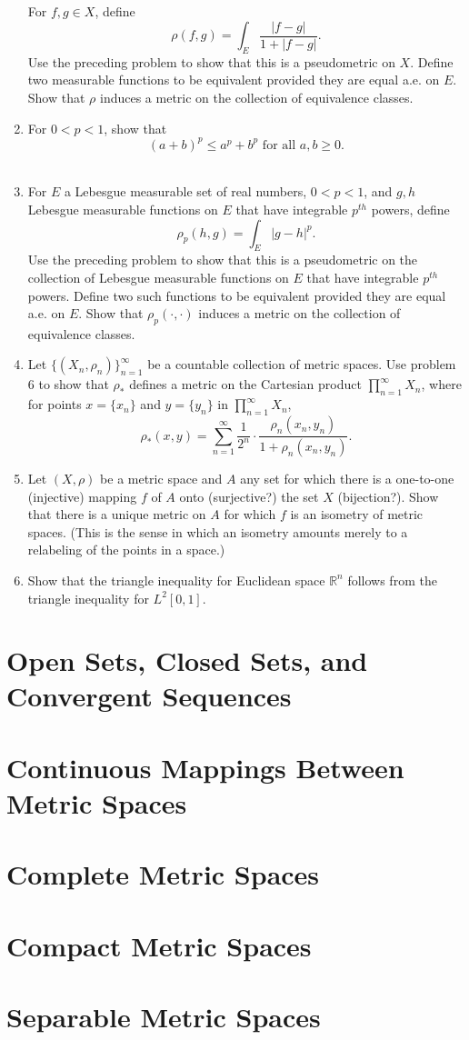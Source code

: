 \begin{enumerate}
    For $f,g\in X$, define
    \[
    \rho(f,g)=\int_E\frac{|f-g|}{1+|f-g|}.    
    \]
    Use the preceding problem to show that this is a pseudometric on $X$. 
    Define two measurable functions to be equivalent provided they are equal a.e. on $E$.
    Show that $\rho$ induces a metric on the collection of equivalence classes.
    \item For $0<p<1$, show that 
    \[
    (a+b)^p\le a^p+b^p\text{ for all }a,b\ge0.    
    \]\
    \item For $E$ a Lebesgue measurable set of real numbers, $0<p<1$, and $g,h$ Lebesgue measurable functions on $E$ that have integrable $p^{th}$ powers, define
    \[
    \rho_p(h,g)=\int_E|g-h|^p.    
    \]  
    Use the preceding problem to show that this is a pseudometric on the collection of Lebesgue measurable functions on $E$ that have integrable $p^{th}$ powers.
    Define two such functions to be equivalent provided they are equal a.e. on $E$. 
    Show that $\rho_p(\cdot,\cdot)$ induces a metric on the collection of equivalence classes.
    \item Let $\{(X_n,\rho_n)\}_{n=1}^\infty$ be a countable collection of metric spaces.
    Use problem 6 to show that $\rho_*$ defines a metric on the Cartesian product $\prod_{n=1}^\infty X_n$, where for points $x = \{x_n\}$ and $y= \{y_n\}$ in $\prod_{n=1}^\infty X_n$,
    \[
    \rho_*(x,y)=\sum_{n=1}^\infty\frac{1}{2^n}\cdot\frac{\rho_n(x_n,y_n)}{1+\rho_n(x_n,y_n)}.    
    \]
    \item Let $(X,\rho)$ be a metric space and $A$ any set for which there is a one-to-one (injective) mapping $f$ of $A$ onto (surjective?) the set $X$ (bijection?).
    Show that there is a unique metric on $A$ for which $f$ is an isometry of metric spaces.
    (This is the sense in which an isometry amounts merely to a relabeling of the points in a space.)
    \item Show that the triangle inequality for Euclidean space $\mathbb{R}^n$ follows from the triangle inequality for $L^2[0,1]$.
\end{enumerate}

\section{Open Sets, Closed Sets, and Convergent Sequences}

\section{Continuous Mappings Between Metric Spaces}

\section{Complete Metric Spaces}

\section{Compact Metric Spaces}

\section{Separable Metric Spaces}
